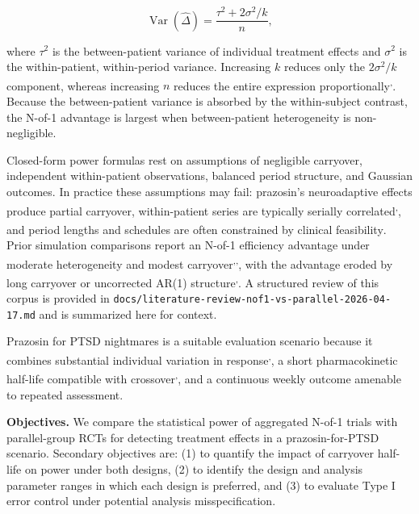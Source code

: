 \documentclass[
  11pt,
]{article}
\begin{document}
\[\operatorname{Var}(\hat{\Delta}) =
  \frac{\tau^{2} + 2\sigma^{2}/k}{n},\]

where \(\tau^{2}\) is the between-patient variance of individual
treatment effects and \(\sigma^{2}\) is the within-patient,
within-period variance. Increasing \(k\) reduces only the
\(2\sigma^{2}/k\) component, whereas increasing \(n\) reduces the
entire expression proportionally\textsuperscript{,}. Because the between-patient
variance is absorbed by the within-subject contrast, the N-of-1
advantage is largest when between-patient heterogeneity is
non-negligible.

Closed-form power formulas rest on assumptions of negligible
carryover, independent within-patient observations, balanced
period structure, and Gaussian outcomes. In practice these
assumptions may fail: prazosin's neuroadaptive effects produce
partial carryover\textsuperscript{},
within-patient series are typically serially correlated\textsuperscript{,}, and
period lengths and schedules are often constrained by clinical
feasibility\textsuperscript{}. Prior simulation
comparisons report an N-of-1 efficiency advantage under moderate
heterogeneity and modest carryover\textsuperscript{,,}, with the
advantage eroded by long carryover or uncorrected AR(1)
structure\textsuperscript{,}.
A structured review of this corpus is provided in
\texttt{docs/literature-review-nof1-vs-parallel-2026-04-17.md} and is
summarized here for context.

Prazosin for PTSD nightmares is a suitable evaluation scenario
because it combines substantial individual variation in response\textsuperscript{,}, a short pharmacokinetic
half-life compatible with crossover\textsuperscript{,}, and
a continuous weekly outcome amenable to repeated assessment.

\textbf{Objectives.} We compare the statistical power of aggregated
N-of-1 trials with parallel-group RCTs for detecting treatment
effects in a prazosin-for-PTSD scenario. Secondary objectives
are: (1) to quantify the impact of carryover half-life on power
under both designs, (2) to identify the design and analysis
parameter ranges in which each design is preferred, and (3) to
evaluate Type I error control under potential analysis
misspecification.
\end{document}
